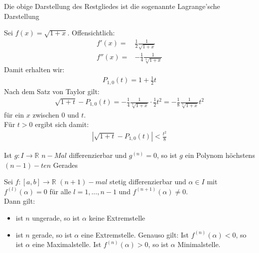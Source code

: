 \begin{Bemerkung}{
	Die obige Darstellung des Restgliedes ist die sogenannte 
	Lagrange'sche Darstellung
}\end{Bemerkung}


\begin{Beispiel}{
	Sei $f(x) = \sqrt{1 +x}$. Offensichtlich: 
	\begin{align*}
		f'(x) = & \frac{1}{2} \frac{1}{\sqrt{1+x}} \\
		f''(x) = & -\frac{1}{4} \frac{1}{\sqrt[3]{1+x}}
	\end{align*}
	Damit erhalten wir: 
	\begin{align*}
		P_{1,0}(t) = 1 + \frac{1}{2}t
	\end{align*}
	Nach dem Satz von Taylor gilt:
	\begin{align*}
		\sqrt{1 +t} - P_{1, 0}(t) = -\frac{1}{4} \frac{1}{\sqrt[3]{1+x}} \cdot
		 \frac{1}{2}t^2 = -\frac{1}{8}\frac{1}{\sqrt[3]{1+x}}t	^2
	\end{align*}
	für ein $x$ zwischen $0$ und $t$. \\
	Für $t > 0$ ergibt sich damit: 
	\begin{align*}
		\left\vert \sqrt{1 + t} - P_{1,0}(t)\right\vert < \frac{t^2}{8}
	\end{align*}
	
}\end{Beispiel}

\begin{Korollar}{
	Ist $g: I \rightarrow \mathbb{R}$ $n-Mal$ differenzierbar und 
	$g^{(n)} = 0$, so ist $g$ ein Polynom höchstens $(n-1)-ten$ Gerades
}\end{Korollar}

\begin{Korollar}{
	Sei $f: [a,b] \rightarrow \mathbb{R}$ $(n+1)-mal$ stetig differenzierbar 
	und $\alpha \in I$ mit $f^{(l)}(\alpha) = 0$ für alle $ l = 1, ..., n-1$ und 
	$f^{(n+1)}(\alpha) \neq 0$. \\
	Dann gilt:
	\begin{itemize}
		\item ist $n$ ungerade, so ist $\alpha$ keine Extremstelle
		\item ist $n$ gerade, so ist $\alpha$ eine Extremstelle.
			Genauso gilt: Ist $f^{(n)}(\alpha) < 0$, so ist 
			$\alpha$ eine Maximalstelle. Ist $f^{(n)}(\alpha)>0$, so ist 
			$\alpha$ Minimalstelle.
	\end{itemize}
}\end{Korollar}

